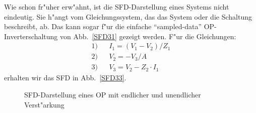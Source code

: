 Wie schon fr"uher erw"ahnt, ist die SFD-Darstellung eines Systems
nicht eindeutig. Sie h"angt vom Gleichungssystem, das das System oder
die Schaltung beschreibt, ab. Das kann sogar f"ur die einfache
``sampled-data'' OP-Inverterschaltung von Abb.~\ref{SFD31} gezeigt
werden. F"ur die Gleichungen:
\begin{eqnarray}
  1) & & I_1 = (V_1-V_2)/Z_1 \nonumber \\
  2) & & V_2 = -V_3/A \label{mathSFD33}\\
  3) & & V_3 = V_2-Z_2\cdot I_1 \nonumber
\end{eqnarray}
erhalten wir das SFD in Abb.~\ref{SFD33}.
\begin{figure}[htb!]
\vspace*{-8mm}\begin{center}
  \caption{SFD-Darstellung eines OP mit endlicher und unendlicher
Verst"arkung}\label{SFD32}
\end{center}
\vspace*{-7mm}
\end{figure}

